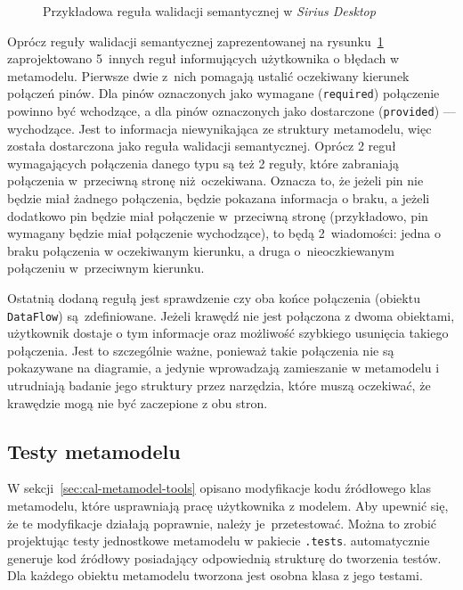 \begin{figure}[!ht]
	\caption{Przykładowa reguła walidacji semantycznej w \emph{Sirius
    Desktop}}\label{rys:sirius-desktop-example-semantic-validation-rule}
  \medskip
\end{figure}

Oprócz reguły walidacji semantycznej zaprezentowanej na
rysunku~\ref{rys:sirius-desktop-example-semantic-validation-rule}
zaprojektowano 5~innych reguł informujących użytkownika o błędach w metamodelu.
Pierwsze dwie z~nich pomagają ustalić oczekiwany kierunek połączeń pinów. Dla
pinów oznaczonych jako wymagane (\texttt{required}) połączenie powinno być
wchodzące, a dla pinów oznaczonych jako dostarczone (\texttt{provided}) ---
wychodzące. Jest to informacja niewynikająca ze struktury metamodelu, więc
została dostarczona jako reguła walidacji semantycznej. Oprócz 2 reguł
wymagających połączenia danego typu są też 2 reguły, które zabraniają
połączenia w~przeciwną stronę niż~oczekiwana. Oznacza to, że jeżeli pin nie
będzie miał żadnego połączenia, będzie pokazana informacja o braku, a jeżeli
dodatkowo pin będzie miał połączenie w~przeciwną stronę (przykładowo, pin
wymagany będzie miał połączenie wychodzące), to będą 2~wiadomości: jedna o
braku połączenia w oczekiwanym kierunku, a druga o~nieoczkiewanym połączeniu
w~przeciwnym kierunku.

Ostatnią dodaną regułą jest sprawdzenie czy oba końce połączenia (obiektu
\texttt{DataFlow}) są~zdefiniowane. Jeżeli krawędź nie jest połączona z dwoma
obiektami, użytkownik dostaje o tym informacje oraz możliwość szybkiego
usunięcia takiego połączenia. Jest to szczególnie ważne, ponieważ takie
połączenia nie są pokazywane na diagramie, a jedynie wprowadzają zamieszanie w
metamodelu i utrudniają badanie jego struktury przez narzędzia, które muszą
oczekiwać, że krawędzie mogą nie być zaczepione z obu stron.

\subsection{Testy metamodelu}\label{sec:testy-metamodelu}

W sekcji~\ref{sec:cal-metamodel-tools} opisano modyfikacje kodu źródłowego klas
metamodelu, które usprawniają pracę użytkownika z modelem. Aby upewnić się, że
te modyfikacje działają poprawnie, należy je~przetestować. Można to zrobić
projektując testy
jednostkowe metamodelu w pakiecie \texttt{.tests}. \SiriusDesktop{}
automatycznie generuje kod źródłowy posiadający odpowiednią strukturę do
tworzenia testów. Dla każdego obiektu metamodelu tworzona jest osobna klasa z
jego testami.

